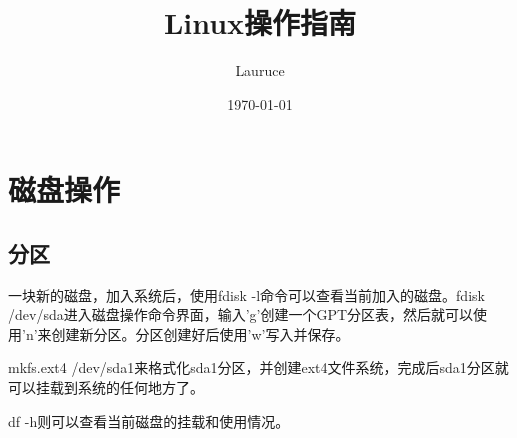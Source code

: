 \documentclass[UTF8,a4paper,12pt]{article}
\title{\heiti Linux操作指南}
\author{\heiti Lauruce}
\date{\today}
\begin{document}
    \maketitle
    \thispagestyle{empty}
    
    \newpage
    \tableofcontents
    \thispagestyle{empty}

    \newpage
    \setcounter{page}{1}
    \section{磁盘操作}
    \subsection{分区}
        一块新的磁盘，加入系统后，使用fdisk -l命令可以查看当前加入的磁盘。fdisk /dev/sda进入磁盘操作命令界面，输入'g'创建一个GPT分区表，然后就可以使用'n'来创建新分区。分区创建好后使用'w'写入并保存。

        mkfs.ext4 /dev/sda1来格式化sda1分区，并创建ext4文件系统，完成后sda1分区就可以挂载到系统的任何地方了。

        df -h则可以查看当前磁盘的挂载和使用情况。


\end{document}
